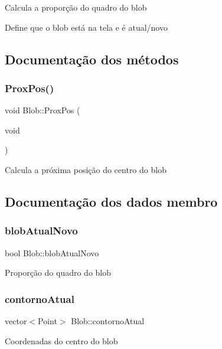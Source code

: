 Calcula a proporção do quadro do blob

Define que o blob está na tela e é atual/novo 

\subsection{Documentação dos métodos}
\mbox{\label{class_blob_afbea7ea42d7e01e4d84c799d5fd7e8a5}} 
\subsubsection{\texorpdfstring{Prox\+Pos()}{ProxPos()}}
{\footnotesize\ttfamily void Blob\+::\+Prox\+Pos (\begin{DoxyParamCaption}\item[{void}]{ }\end{DoxyParamCaption})}

Calcula a próxima posição do centro do blob 

\subsection{Documentação dos dados membro}
\mbox{\label{class_blob_a121b1af88b7c0752403f6eca92ab2150}} 
\subsubsection{\texorpdfstring{blob\+Atual\+Novo}{blobAtualNovo}}
{\footnotesize\ttfamily bool Blob\+::blob\+Atual\+Novo}

Proporção do quadro do blob \mbox{\label{class_blob_a83d705f2b426be288d87c6f606175889}} 
\subsubsection{\texorpdfstring{contorno\+Atual}{contornoAtual}}
{\footnotesize\ttfamily vector$<$Point$>$ Blob\+::contorno\+Atual}

Coordenadas do centro do blob \mbox{\label{class_blob_ad77546934e684be45fa6d12d8370d0c7}} 
